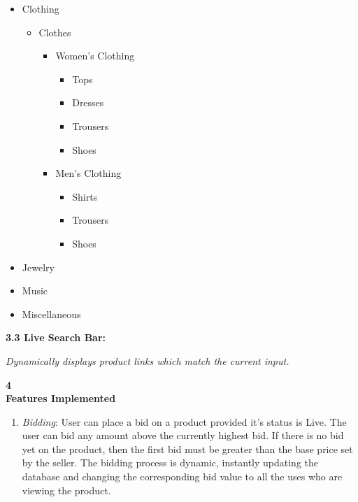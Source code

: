 \documentclass[a4paper,12pt]{article}
\begin{document}
{\begin{itemize}
\begin{itemize}
      \end{itemize}
\item
Clothing
      \begin{itemize}
\item      Clothes
	    \begin{itemize}
\item	  Women's Clothing
	      \begin{itemize}
\item	      Tops
\item	      Dresses
\item	      Trousers
\item	      Shoes
	      \end{itemize}
\item	  Men's Clothing
	      \begin{itemize}
\item	      Shirts
\item	      Trousers
\item	      Shoes
	      \end{itemize}
	  \end{itemize}
      \end{itemize}
\item
Jewelry
\item
Music
\item
Miscellaneous 
\end{itemize}

\large{{\textbf{3.3 Live Search Bar: }} \vspace{5pt}

\normalsize \textsl {Dynamically displays product links which match the current input.} \\

\vspace{5pt}

\huge{\textbf{4 \\ Features Implemented}} \vspace{12pt}

\normalsize

\begin{enumerate}
\item 
\textit{Bidding}: User can place a bid on a product provided it's status is Live. The user can bid any amount above the currently highest bid. If there is no bid yet on the product, then the first bid must be greater than the base price set by the seller. The bidding process is dynamic, instantly updating the database and changing the corresponding bid value to all the uses who are viewing the product. \\


\end{enumerate}}}
\end{document}
